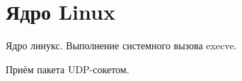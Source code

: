 \section{Ядро Linux}

Ядро линукс. Выполнение системного вызова execve.

Приём пакета UDP-сокетом.

\clearpage
